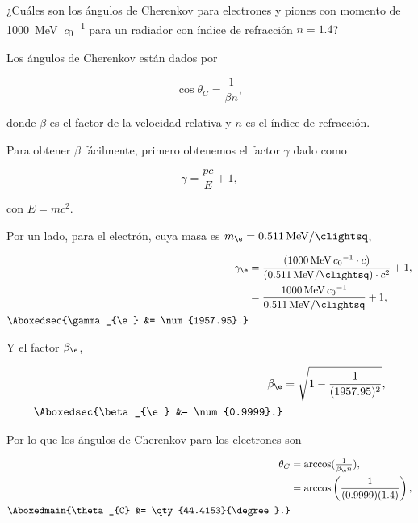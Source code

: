 \documentclass[./../main.tex]{subfiles}
\begin{document}
	\begin{exercise}
		¿Cuáles son los ángulos de Cherenkov para electrones y piones con momento de \qty{1000}{\MeV\per\clight} para un radiador con índice de refracción \(n = 1.4\)?

		\begin{solution}
			Los ángulos de Cherenkov están dados por

			\begin{equation*}
				\cos\theta_{C} = \dfrac{1}{\beta n},
			\end{equation*}

			donde \(\beta\) es el factor de la velocidad relativa y \(n\) es el índice de refracción.

			Para obtener \(\beta\) fácilmente, primero obtenemos el factor \(\gamma\) dado como

			\begin{equation*}
				\gamma = \dfrac{pc}{E} + 1,
			\end{equation*}

			con \(E = mc^{2}\).

			Por un lado, para el electrón, cuya masa es \(m_{\e} = \qty{0.511}{\MeV\per\clightsq}\),

			\begin{align*}
				\gamma_{\e} &= \dfrac{(\qty{1000}{\MeV\per\clight}\cdot c)}{(\qty{0.511}{\MeV\per\clightsq})\cdot c^{2}} + 1,\\
				&= \dfrac{\qty{1000}{\MeV\per\clight}}{\qty{0.511}{\MeV\per\clightsq}} + 1,\\
				\Aboxedsec{\gamma_{\e} &= \num{1957.95}.}
			\end{align*}

			Y el factor \(\beta_{\e}\),

			\begin{align*}
				\beta_{\e} &= \sqrt{1 - \dfrac{1}{(\num{1957.95})^{2}}},\\
				\Aboxedsec{\beta_{\e} &= \num{0.9999}.}
			\end{align*}

			Por lo que los ángulos de Cherenkov para los electrones son

			\begin{align*}
				\theta_{C} &= \arccos(\tfrac{1}{\beta_{\e} n}),\\
				&= \arccos\left(\dfrac{1}{(\num{0.9999})(1.4)}\right),\\
				\Aboxedmain{\theta_{C} &= \qty{44.4153}{\degree}.}
			\end{align*}


\end{solution}
\end{exercise}
\end{document}
